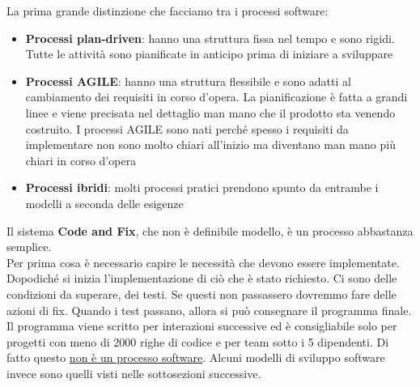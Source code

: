 La prima grande distinzione che facciamo tra i processi software:
\begin{itemize}[noitemsep]
    \item \textbf{Processi plan-driven}: hanno una struttura fissa nel tempo e sono rigidi. Tutte le attività sono pianificate in anticipo prima di iniziare a sviluppare
    \item \textbf{Processi AGILE}: hanno una struttura flessibile e sono adatti al cambiamento dei requisiti in corso d'opera. La pianificazione è fatta a grandi linee e viene precisata nel dettaglio man mano che il prodotto sta venendo costruito. I processi AGILE sono nati perché spesso i requisiti da implementare non sono molto chiari all'inizio ma diventano man mano più chiari in corso d'opera
    \item \textbf{Processi ibridi}: molti processi pratici prendono spunto da entrambe i modelli a seconda delle esigenze
\end{itemize}
Il sistema \textbf{Code and Fix}, che non è definibile modello, è un processo abbastanza semplice.\\
Per prima cosa è necessario capire le necessità che devono essere implementate.
Dopodiché si inizia l'implementazione di ciò che è stato richiesto.
Ci sono delle condizioni da superare, dei testi.
Se questi non passassero dovremmo fare delle azioni di fix.
Quando i test passano, allora si può consegnare il programma finale.
Il programma viene scritto per interazioni successive ed è consigliabile solo per progetti con meno di 2000 righe di codice e per team sotto i 5 dipendenti.
Di fatto questo \underline{non è un processo software}.
Alcuni modelli di sviluppo software invece sono quelli visti nelle sottosezioni successive.

